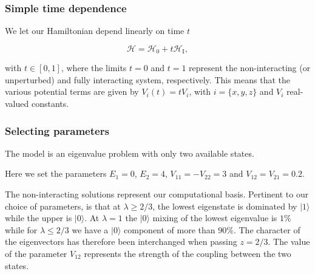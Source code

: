 \documentclass{beamer}
\begin{document}
\begin{frame}
\frametitle{Simple time dependence}

We let our Hamiltonian depend linearly on time  $t$

\[
\mathcal{H}=\mathcal{H}_0+t \mathcal{H}_\mathrm{I},
\]

with $t \in [0,1]$, where the limits $t=0$ and $t=1$
represent the non-interacting (or unperturbed) and fully interacting
system, respectively. This means that the various potential terms are given by $V_i(t)=tV_i$, with $i=\{x,y,z\}$ and $V_i$ real-valued constants.
\end{frame}

\begin{frame}
\frametitle{Selecting parameters}

The model is an eigenvalue problem with only
two available states.

Here we set the parameters $E_1=0$,
$E_2=4$, $V_{11}=-V_{22}=3$ and $V_{12}=V_{21}=0.2$.

The non-interacting solutions represent our computational basis.
Pertinent to our choice of parameters, is that at $\lambda\geq 2/3$,
the lowest eigenstate is dominated by $\vert 1\rangle$ while the upper
is $\vert 0 \rangle$. At $\lambda=1$ the $\vert 0 \rangle$ mixing of
the lowest eigenvalue is $1\%$ while for $\lambda\leq 2/3$ we have a
$\vert 0 \rangle$ component of more than $90\%$.  The character of the
eigenvectors has therefore been interchanged when passing $z=2/3$. The
value of the parameter $V_{12}$ represents the strength of the coupling
between the two states.
\end{frame}
\end{document}
